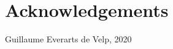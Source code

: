 \chapter*{Acknowledgements}

\begin{flushright}
  Guillaume Everarts de Velp, 2020
\end{flushright}
